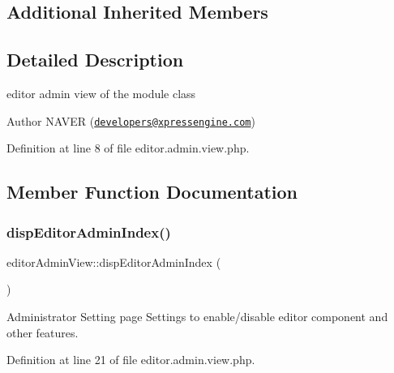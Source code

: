 \subsection*{Additional Inherited Members}


\subsection{Detailed Description}
editor admin view of the module class 

\begin{DoxyAuthor}{Author}
N\+A\+V\+ER (\href{mailto:developers@xpressengine.com}{\tt developers@xpressengine.\+com}) 
\end{DoxyAuthor}


Definition at line 8 of file editor.\+admin.\+view.\+php.



\subsection{Member Function Documentation}
\mbox{\label{classeditorAdminView_ae8fadbf37f9efc8389c45e7171eba8be}} 
\subsubsection{\texorpdfstring{disp\+Editor\+Admin\+Index()}{dispEditorAdminIndex()}}
{\footnotesize\ttfamily editor\+Admin\+View\+::disp\+Editor\+Admin\+Index (\begin{DoxyParamCaption}{ }\end{DoxyParamCaption})}



Administrator Setting page Settings to enable/disable editor component and other features. 



Definition at line 21 of file editor.\+admin.\+view.\+php.

\mbox{\label{classeditorAdminView_aeebafdbe84d4360ae45481f13981ca00}} 
